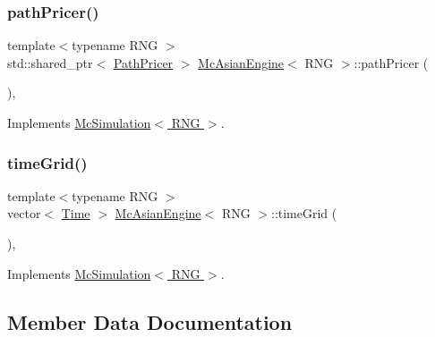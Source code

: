 \subsubsection{\texorpdfstring{path\+Pricer()}{pathPricer()}}
{\footnotesize\ttfamily template$<$typename R\+NG $>$ \\
std\+::shared\+\_\+ptr$<$ \hyperlink{class_path_pricer}{Path\+Pricer} $>$ \hyperlink{class_mc_asian_engine}{Mc\+Asian\+Engine}$<$ R\+NG $>$\+::path\+Pricer (\begin{DoxyParamCaption}{ }\end{DoxyParamCaption})\hspace{0.3cm}{\ttfamily [override]}, {\ttfamily [virtual]}}



Implements \hyperlink{class_mc_simulation_ae3b894a78823df7897abf418bb04a4a1}{Mc\+Simulation$<$ R\+N\+G $>$}.

\hypertarget{class_mc_asian_engine_ad8d2c8721172ab1d7327db91a26c5052}{}\label{class_mc_asian_engine_ad8d2c8721172ab1d7327db91a26c5052} 
\subsubsection{\texorpdfstring{time\+Grid()}{timeGrid()}}
{\footnotesize\ttfamily template$<$typename R\+NG $>$ \\
vector$<$ \hyperlink{_name_def_8h_ac2d3e0ba793497bcca555c7c2cf64ff3}{Time} $>$ \hyperlink{class_mc_asian_engine}{Mc\+Asian\+Engine}$<$ R\+NG $>$\+::time\+Grid (\begin{DoxyParamCaption}{ }\end{DoxyParamCaption})\hspace{0.3cm}{\ttfamily [override]}, {\ttfamily [virtual]}}



Implements \hyperlink{class_mc_simulation_ac3c90184d3d97fc7c01c974ad861f8d9}{Mc\+Simulation$<$ R\+N\+G $>$}.



\subsection{Member Data Documentation}
\hypertarget{class_mc_asian_engine_ae5678e3c643e058d4c5f2d6b0e5fe515}{}\label{class_mc_asian_engine_ae5678e3c643e058d4c5f2d6b0e5fe515} 
